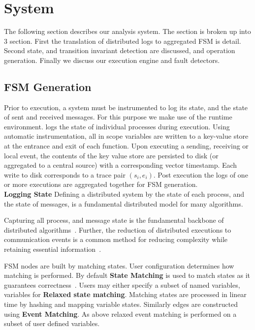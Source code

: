 \section{System}

The following section describes our analysis system. The section is broken up
into 3 section. First the translation of distributed logs to aggregated FSM is
detail. Second state, and transition invariant detection are discussed, and
operation generation. Finally we discuss our execution engine and fault
detectors.

\subsection{FSM Generation}

Prior to execution, a system must be instrumented to log its state, and the
state of sent and received messages. For this purpose we make use of the \dinv
runtime environment. \dinv logs the state of individual processes during
execution. Using automatic instrumentation, all in scope variables are written
to a key-value store at the entrance and exit of each function. Upon executing
a sending, receiving or local event, the contents of the key value store are
persisted to disk (or aggregated to a central source) with a corresponding
vector timestamp. Each write to disk corresponds to a trace pair $(s_i,e_i)$.
Post execution the logs of one or more executions are aggregated together for
FSM generation. \\

\noindent\textbf{Logging State} Defining a distributed system by the state of
each process, and the state of messages, is a fundamental distributed model for
many algorithms.

Capturing all process, and message state is the fundamental backbone of
distributed algorithms~\cite{mattern_vector_clocks_1989,MATTERN1993423}.
Further, the reduction of distributed executions to communication events is a
common method for reducing complexity while retaining essential
information~\cite{Fromentin:1995:OAD:213523.213533,BABAOGLU1995173,5727765,Hurfin:1998:EDD:286181.286G191,FROMENTIN1997522}.

FSM nodes are built by matching states. User
configuration determines how matching is performed. By default \textbf{State
Matching} is used to match states as it guarantees
correctness~\cite{Garg:2014:MAS:2580115.2580404}. Users may either specify a
subset of named variables, variables for \textbf{Relaxed state matching}.
Matching states are processed in linear time by hashing and mapping variable
states. Similarly edges are constructed using \textbf{Event Matching}. As above
relaxed event matching is performed on a subset of user defined variables.

